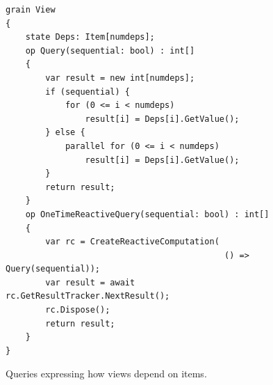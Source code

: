 \begin{figure}
\begin{lstlisting}
grain View
{
	state Deps: Item[numdeps]; 
	op Query(sequential: bool) : int[]
	{	
		var result = new int[numdeps];
		if (sequential) {
			for (0 <= i < numdeps)
				result[i] = Deps[i].GetValue();
		} else {
			parallel for (0 <= i < numdeps)
				result[i] = Deps[i].GetValue();
		}
		return result;
	}
	op OneTimeReactiveQuery(sequential: bool) : int[]
	{
	 	var rc = CreateReactiveComputation(
	 										() => Query(sequential));
		var result = await rc.GetResultTracker.NextResult();
		rc.Dispose();
		return result;
	}
}
\end{lstlisting}
\caption{Queries expressing how views depend on items.}\label{fig:queries}
\end{figure}

